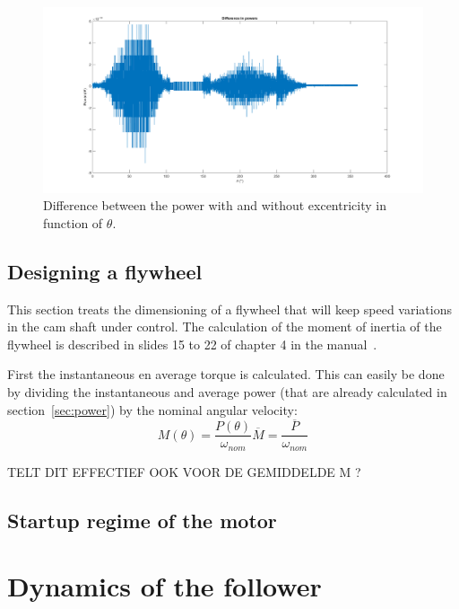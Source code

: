 \documentclass[a4paper]{article}
\begin{document}
\begin{figure}
	\centering
	\includegraphics[width=\textwidth]{diffpower.png}
	\caption{Difference between the power with and without excentricity in function of \(\theta\).}
	\label{diffpower}
\end{figure}

\subsection{Designing a flywheel}

This section treats the dimensioning of a flywheel that will keep speed variations in the cam shaft under control. The calculation of the moment of inertia of the flywheel is described in slides 15 to 22 of chapter 4 in the manual~\cite{cursus}.

First the instantaneous en average torque is calculated. This can easily be done by dividing the instantaneous and average power (that are already calculated in section~\ref{sec:power}) by the nominal angular velocity:
\begin{subequations}
\begin{equation}
	M(\theta)=\frac{P(\theta)}{\omega_{nom}}
\end{equation}
\begin{equation}
	\overline{M}=\frac{\overline{P}}{\omega_{nom}}
\end{equation}
\end{subequations}

TELT DIT EFFECTIEF OOK VOOR DE GEMIDDELDE M ?

\subsection{Startup regime of the motor}

\section{Dynamics of the follower}



\end{document}
